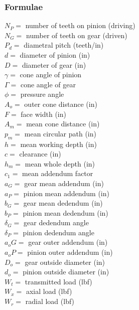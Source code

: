 \documentclass[11pt, fleqn]{article}
\begin{document}
\subsubsection{Formulae}
$N_P=$ number of teeth on pinion (driving)\\
$N_G=$ number of teeth on gear (driven)\\
$P_d=$ diametral pitch (teeth/in)\\
$d=$ diameter of pinion (in)\\
$D=$ diameter of gear (in)\\
$\gamma=$ cone angle of pinion\\
$\Gamma=$ cone angle of gear\\
$\phi=$ pressure angle\\
$A_o=$ outer cone distance (in)\\
$F=$ face width (in)\\
$A_m=$ mean cone distance (in)\\
$p_m=$ mean circular path (in)\\
$h=$ mean working depth (in)\\
$c=$ clearance (in)\\
$h_m=$ mean whole depth (in)\\
$c_1=$ mean addendum factor\\
$a_G=$ gear mean addendum (in)\\
$a_P=$ pinion mean addendum (in)\\
$b_G=$ gear mean dedendum (in)\\
$b_P=$ pinion mean dedendum (in)\\
$\delta_G=$ gear dedendum angle\\
$\delta_P=$ pinion dedendum angle\\
$a_oG=$ gear outer addendum (in)\\
$a_oP=$ pinion outer addendum (in)\\
$D_o=$ gear outside diameter (in)\\
$d_o=$ pinion outside diameter (in)\\
$W_t=$ transmitted load (lbf)\\
$W_x=$ axial load (lbf)\\
$W_r=$ radial load (lbf)\\
\end{document}
